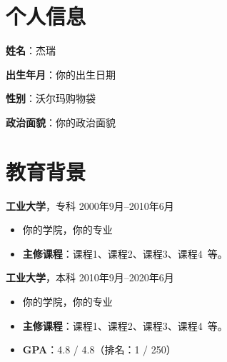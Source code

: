 \documentclass[11pt]{article}
\newlength{\iconwidth}
\begin{document}
    \begin{minipage}[t]{0.78\textwidth}
        \begin{minipage}[t]{\textwidth}
        \section[个人信息]{\makebox[\iconwidth][c]{\color{primary_color}{\faAddressCard}}\quad 个人信息}
        \begin{minipage}[t]{0.5\textwidth}
            \textbf{姓\qquad 名}：杰瑞
            
            \vspace{0.5em}
            \textbf{出生年月}：你的出生日期
        \end{minipage}
        \begin{minipage}[t]{0.35\textwidth}
            \textbf{性\qquad 别}：沃尔玛购物袋
            
            \vspace{0.5em}
            \textbf{政治面貌}：你的政治面貌
        \end{minipage}
        \vspace{1.2em}
        \end{minipage}

        \begin{minipage}[t]{\textwidth}
        \section[教育背景]{\makebox[\iconwidth][c]{\color{primary_color}{\faGraduationCap}}\quad 教育背景}
        
        {\large \textbf{工业大学}}，专科 \hfill 2000年9月--2010年6月
        \begin{itemize}
            \item 你的学院，你的专业
            \item \textbf{主修课程}：课程1、课程2、课程3、课程4\ 等。
        \end{itemize}
        
        \vspace{0.5em}
        {\large \textbf{工业大学}}，本科 \hfill 2010年9月--2020年6月
        \begin{itemize}
            \item 你的学院，你的专业
            \item \textbf{主修课程}：课程1、课程2、课程3、课程4\ 等。
            \item \textbf{GPA}：4.8 / 4.8（排名：1 / 250）
        \end{itemize}
        

\end{minipage}
\end{minipage}
\end{document}
